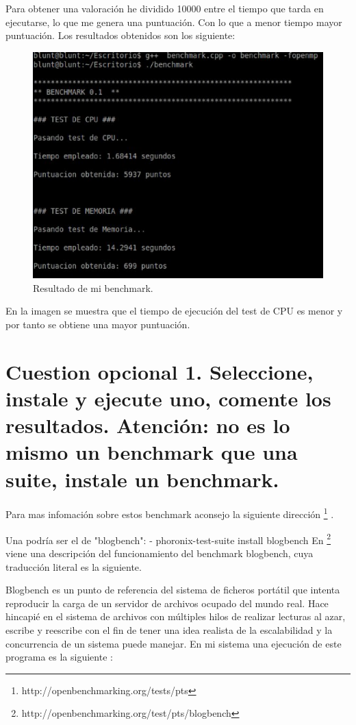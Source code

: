 Para obtener una valoración he dividido 10000 entre el tiempo que tarda en ejecutarse, lo que me genera una puntuación. Con lo que a menor tiempo mayor puntuación.
Los resultados obtenidos son los siguiente:
\begin{figure}[H]
\begin{center}
\includegraphics[scale=0.4]{imagenes/imagen5.eps}
\caption{Resultado de mi benchmark.}
\end{center}
\end{figure}
En la imagen se muestra que el tiempo de ejecución del test de CPU es menor y por tanto se obtiene una mayor puntuación.

\section*{Cuestion opcional 1. Seleccione, instale y ejecute uno, comente los resultados. Atención: no es lo mismo un benchmark que una suite, instale un benchmark.}
Para mas infomación sobre estos benchmark aconsejo la siguiente dirección \footnote{http://openbenchmarking.org/tests/pts}
.

Una podría ser el de "blogbench": 
- phoronix-test-suite install blogbench 
En \footnote{http://openbenchmarking.org/test/pts/blogbench} viene una descripción del funcionamiento del benchmark blogbench, cuya traducción literal es la siguiente.

Blogbench es un punto de referencia del sistema de ficheros portátil que intenta reproducir la carga de un servidor de archivos ocupado del mundo real. Hace hincapié en el sistema de archivos con múltiples hilos de realizar lecturas al azar, escribe y reescribe con el fin de tener una idea realista de la escalabilidad y la concurrencia de un sistema puede manejar.
En mi sistema una ejecución de este programa es la siguiente :

